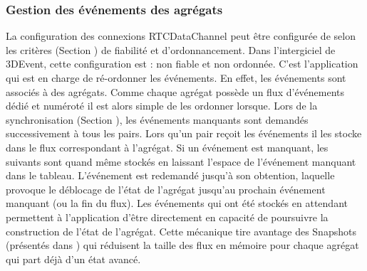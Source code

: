 \subsubsection{Gestion des événements des agrégats}

La configuration des connexions RTCDataChannel peut être configurée de selon 
les critères (Section ) de fiabilité et d'ordonnancement. 
Dans l'intergiciel de 3DEvent, cette configuration est : non fiable et non ordonnée. 
C'est l'application qui est en charge de \og ré-ordonner\fg{} les événements. En 
effet, les événements sont associés à des agrégats. Comme chaque agrégat 
possède un flux d'événements dédié et numéroté il est alors simple de les 
ordonner lorsque. 
Lors de la synchronisation (Section ), les 
événements manquants sont demandés successivement à tous les pairs. Lors 
qu'un pair reçoit les événements il les stocke dans le flux correspondant à 
l'agrégat. Si un événement est manquant, les suivants sont quand même stockés 
en laissant l'espace de l'événement manquant dans le tableau. L'événement est 
redemandé jusqu'à son obtention, laquelle provoque le déblocage de l'état de 
l'agrégat jusqu'au prochain événement manquant (ou la fin du flux). Les 
événements qui ont été stockés \og en attendant\fg{} permettent à l'application 
d'être directement en capacité de poursuivre la construction de l'état de l'agrégat. 
Cette mécanique tire avantage des Snapshots (présentés dans ) 
qui réduisent la taille des flux en mémoire pour chaque agrégat qui part déjà d'un 
état avancé.

